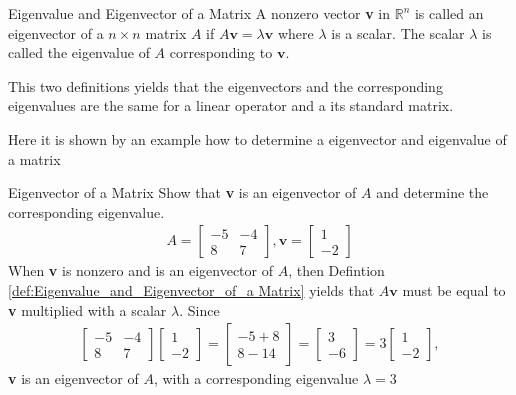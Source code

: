 \begin{definition}{Eigenvalue and Eigenvector of a Matrix}
A nonzero vector \textbf{v} in $\mathbb{R}^n$ is called an eigenvector of a $n \times n$ matrix $A$ if $A\textbf{v}=\lambda\textbf{v}$ where $\lambda$ is a scalar. The scalar $\lambda$ is called the eigenvalue of $A$ corresponding to $\textbf{v}$.
\label{def:Eigenvalue_and_Eigenvector_of_a Matrix}
\end{definition}

This two definitions yields that the eigenvectors and the corresponding eigenvalues are the same for a linear operator and a its standard matrix.

Here it is shown by an example how to determine a eigenvector and eigenvalue of a matrix
\begin{example}{Eigenvector of a Matrix}
Show that \textbf{v} is an eigenvector of $A$ and determine the corresponding eigenvalue. 
\begin{align*}
A = \begin{bmatrix}-5 & -4 \\8 & 7 \end{bmatrix}, \textbf{v} =\begin{bmatrix}1 \\-2\end{bmatrix}
\end{align*}
When \textbf{v} is nonzero and is an eigenvector of $A$, then Defintion \ref{def:Eigenvalue_and_Eigenvector_of_a Matrix} yields that $A\textbf{v}$ must be equal to \textbf{v} multiplied with a scalar $\lambda$. Since  
\begin{align*}
\begin{bmatrix}-5 & -4 \\8 & 7 \end{bmatrix} \begin{bmatrix}1 \\-2\end{bmatrix} = \begin{bmatrix}-5 + 8 \\8  -14 \end{bmatrix} = \begin{bmatrix}3 \\-6 \end{bmatrix} = 3\begin{bmatrix}1\\-2 \end{bmatrix},
\end{align*}
\textbf{v} is an eigenvector of $A$, with a corresponding eigenvalue $\lambda=3$
\label{exa:EigenValueVectorMatrix}
\end{example}

